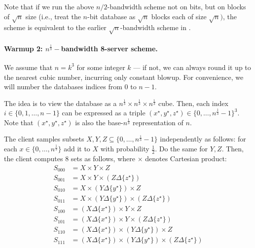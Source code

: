 \begin{remark}        
Note that if we run the above $n/2$-bandwidth scheme not on bits,
but on blocks of $\sqrt{n}$ size (i.e., treat
the $n$-bit database as $\sqrt{n}$ blocks each of size $\sqrt{n})$, 
the scheme is equivalent to the earlier $\sqrt{n}$-bandwidth scheme
in .
\end{remark}
	
\paragraph{Warmup 2: $n^{\frac 1 3}-$bandwidth 8-server scheme.}
We assume that $n = k^3$ 
for some integer $k$ --- if not, we can always
round 
it up to the nearest cubic number, incurring only constant blowup.
For convenience, we will number
the databases indices from $0$ to $n-1$.


The idea is to view the database as a $n^{\frac 1 3} \times n^{\frac 1 3} \times n^{\frac 1 3}$ cube. Then, each index $i \in \{0,1,\dots,n - 1\}$ can be expressed as a triple 
$(x^\star, y^\star, z^\star) \in \{0, \ldots, n^{\frac{1}{3}}-1\}^3$.
Note that 
$(x^\star, y^\star, z^\star)$ is also the base-$n^{\frac{1}{3}}$
representation of $n$. 

The client samples subsets $X,Y,Z \subseteq \{0, \dots, n^{\frac{1}{3}} - 1\}$ independently as follows: for each $x \in \{0,\dots, n^{\frac{1}{3}}\}$ add it to 
$X$ with probability $\frac 1 2$. Do the same for $Y,Z$.
Then, the client computes $8$ sets as follows,
where $\times$ denotes Cartesian product: 
		\begin{align*}
			S_{000} &= X \times Y \times Z \\
			S_{001} &= X \times Y \times (Z \Delta \{z^\star\}) \\
			S_{010} &= X \times (Y \Delta \{y^{\star}\}) \times Z \\
			S_{011} &= X \times (Y \Delta \{y^{\star}\}) \times (Z \Delta \{z^\star\}) \\
			S_{100} &= (X \Delta \{x^{\star}\}) \times Y \times Z \\
			S_{101} &= (X \Delta \{x^{\star}\}) \times Y \times (Z \Delta \{z^\star\}) \\
			S_{110} &= (X \Delta \{x^{\star}\}) \times (Y \Delta \{y^{\star}\}) \times Z \\
			S_{111} &= (X \Delta \{x^{\star}\}) \times (Y \Delta \{y^{\star}\}) \times (Z \Delta \{z^\star\}) \\
		\end{align*}

